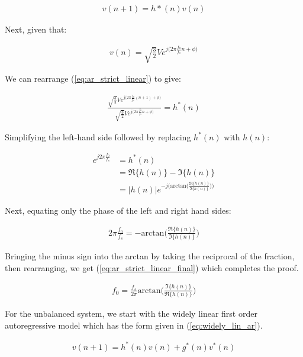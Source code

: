 \begin{align}
v(n+1)=h*(n)v(n) \label{eq:ar_strict_linear}
\end{align}

\noindent{}Next, given that:

\begin{align*}
v(n) = \sqrt{\frac{3}{2}}Ve^{j\big(2\pi\frac{f_0}{f_s}n+\phi\big)}
\end{align*}

\noindent{}We can rearrange (\ref{eq:ar_strict_linear}) to give:

\begin{align*}
\frac{\sqrt{\frac{3}{2}}Ve^{j\big(2\pi\frac{f_0}{f_s}(n+1)+\phi\big)}}{\sqrt{\frac{3}{2}}Ve^{j\big(2\pi\frac{f_0}{f_s}n+\phi\big)}} = h^*(n)
\end{align*}

\noindent{}Simplifying the left-hand side followed by replacing $h^*(n)$ with $h(n)$:

\begin{align*}
e^{j2\pi\frac{f_0}{f_s}} &= h^*(n)\\
&=\Re\{h(n)\} - \Im\{h(n)\} \\
&=|h(n)|e^{-j\big(\text{arctan}\big(\frac{\Re\{h(n)\}}{\Im\{h(n)\}}\big)\big)}
\end{align*}

\noindent{}Next, equating only the phase of the left and right hand sides:

\begin{align*}
2\pi\frac{f_0}{f_s} = -\text{arctan}\bigg(\frac{\Re\{h(n)\}}{\Im\{h(n)\}}\bigg)
\end{align*}

\noindent{}Bringing the minus sign into the arctan by taking the reciprocal of the fraction, then rearranging, we get (\ref{eq:ar_strict_linear_final}) which completes the proof.

\begin{align}
f_0 = \frac{f_s}{2\pi}\text{arctan}\bigg(\frac{\Im\{h(n)\}}{\Re\{h(n)\}}\bigg) \label{eq:ar_strict_linear_final}
\end{align}

\noindent{}For the unbalanced system, we start with the widely linear first order autoregressive model which has the form given in (\ref{eq:widely_lin_ar}).

\begin{align}
v(n+1) = h^*(n)v(n) + g^*(n) v^*(n) \label{eq:widely_lin_ar}
\end{align}

